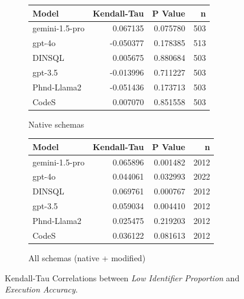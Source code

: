 \begin{figure}
  \centering
  \begin{subfigure}{.5\linewidth}
      \centering
      \begin{tabular}{lrrr}
\toprule
Model & Kendall-Tau & P Value & n \\
\midrule
gemini-1.5-pro & 0.067135 & 0.075780 & 503 \\
gpt-4o & -0.050377 & 0.178385 & 513 \\
DINSQL & 0.005675 & 0.880684 & 503 \\
gpt-3.5 & -0.013996 & 0.711227 & 503 \\
Phnd-Llama2 & -0.051436 & 0.173713 & 503 \\
CodeS & 0.007070 & 0.851558 & 503 \\
\bottomrule
\end{tabular}

      \caption{Native schemas}
      \label{table:natmedium-manual-match-ktau-native}
  \end{subfigure}%
  \begin{subfigure}{.5\linewidth}
      \centering
      \begin{tabular}{lrrr}
\toprule
Model & Kendall-Tau & P Value & n \\
\midrule
gemini-1.5-pro & 0.065896 & 0.001482 & 2012 \\
gpt-4o & 0.044061 & 0.032993 & 2022 \\
DINSQL & 0.069761 & 0.000767 & 2012 \\
gpt-3.5 & 0.059034 & 0.004410 & 2012 \\
Phnd-Llama2 & 0.025475 & 0.219203 & 2012 \\
CodeS & 0.036122 & 0.081613 & 2012 \\
\bottomrule
\end{tabular}

      \caption{All schemas (native + modified)}
      \label{table:natmedium-manual-match-ktau-all}
  \end{subfigure}
  \caption{Kendall-Tau Correlations between \emph{Low Identifier Proportion} and \emph{Execution Accuracy}.}
\end{figure}

